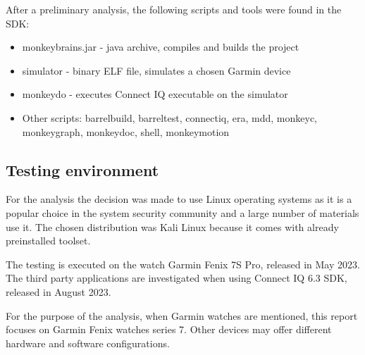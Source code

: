 After a preliminary analysis, the following scripts and tools were found in the SDK:

\begin{itemize}
    \item monkeybrains.jar - java archive, compiles and builds the project
    \item simulator - binary ELF file, simulates a chosen Garmin device
    \item monkeydo - executes Connect IQ executable on the simulator
    \item Other scripts: barrelbuild, barreltest, connectiq, era, mdd, monkeyc, monkeygraph, monkeydoc, shell, monkeymotion
\end{itemize}

\subsection{Testing environment}
For the analysis the decision was made to use Linux operating systems as it is a popular choice in the system security community and a large number of materials use it.
The chosen distribution was Kali Linux because it comes with already preinstalled toolset.

The testing is executed on the watch Garmin Fenix 7S Pro, released in May 2023.
The third party applications are investigated when using Connect IQ 6.3 SDK, released in August 2023.

For the purpose of the analysis, when Garmin watches are mentioned, this report focuses on Garmin Fenix watches series 7.
Other devices may offer different hardware and software configurations.



